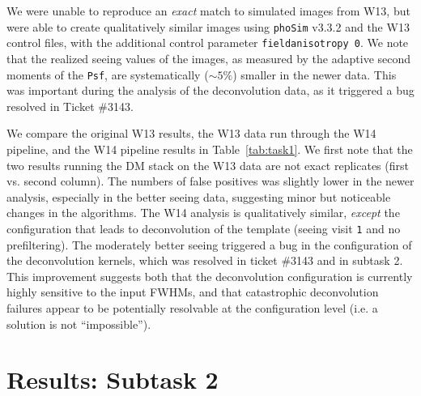 \documentclass[prd, nofootinbib, floatfix, 11pt, tightenlines, times]{article}
\begin{document}
We were unable to reproduce an {\it exact} match to simulated images
from W13, but were able to create qualitatively similar images using
{\tt phoSim} v3.3.2 and the W13 control files, with the additional
control parameter {\tt fieldanisotropy 0}.  We note that the realized
seeing values of the images, as measured by the adaptive second
moments of the {\tt Psf}, are systematically ($\sim 5\%$) smaller in
the newer data.  This was important during the analysis of the
deconvolution data, as it triggered a bug resolved in Ticket \#3143.

We compare the original W13 results, the W13 data run through the W14
pipeline, and the W14 pipeline results in Table~\ref{tab:task1}.  We
first note that the two results running the DM stack on the W13 data
are not exact replicates (first vs. second column). The numbers of
false positives was slightly lower in the newer analysis, especially
in the better seeing data, suggesting minor but noticeable changes in
the algorithms.  The W14 analysis is qualitatively similar, {\it
  except} the configuration that leads to deconvolution of the
template (seeing visit {\tt 1} and no prefiltering).  The moderately
better seeing triggered a bug in the configuration of the
deconvolution kernels, which was resolved in ticket \#3143 and in
subtask 2.  This improvement suggests both that the deconvolution
configuration is currently highly sensitive to the input FWHMs, and
that catastrophic deconvolution failures appear to be potentially
resolvable at the configuration level (i.e. a solution is not
``impossible'').

\section{Results: Subtask 2 \label{sec:task2}}
\end{document}
